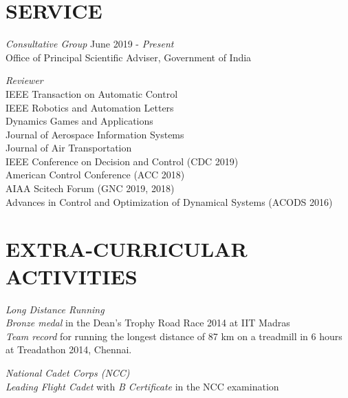 \documentclass[margin, 10pt]{res} %
\begin{document}
\begin{resume}

\section{SERVICE}

{\sl Consultative Group} \hfill June 2019 - \emph{Present}\\ 
Office of Principal Scientific Adviser, Government of India

{\sl Reviewer}\\
IEEE Transaction on Automatic Control\\
IEEE Robotics and Automation Letters \\
Dynamics Games and Applications\\
Journal of Aerospace Information Systems\\
Journal of Air Transportation\\
IEEE Conference on Decision and Control (CDC 2019)\\
American Control Conference (ACC 2018)\\
AIAA Scitech Forum (GNC 2019, 2018)\\
Advances in Control and Optimization of Dynamical Systems (ACODS 2016)


\section{EXTRA-CURRICULAR ACTIVITIES} 

{\sl Long Distance Running}\\
\emph{Bronze medal} in the Dean’s Trophy Road Race 2014 at IIT Madras \\ 
\emph{Team record} for running the longest distance of 87 km on a treadmill in 6 hours at Treadathon 2014,
Chennai.

{\sl National Cadet Corps (NCC)}\\
\emph{Leading Flight Cadet} with \emph{B Certificate} in the NCC examination


%
%

\end{resume}
\end{document}
